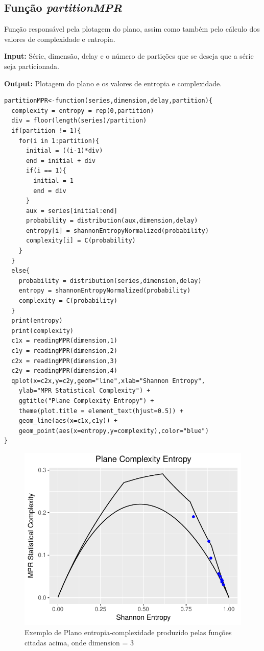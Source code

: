 \documentclass[12pt,letterpaper]{article}
\begin{document}
\subsection{Função \textit{partitionMPR}}

Função responsável pela plotagem do plano, assim como também pelo cálculo dos valores de complexidade e entropia.

\textbf{Input: } Série, dimensão, delay e o número de partições que se deseja que a série seja particionada.

\textbf{Output: } Plotagem do plano e os valores de entropia e complexidade.

\begin{lstlisting}
partitionMPR<-function(series,dimension,delay,partition){
  complexity = entropy = rep(0,partition)
  div = floor(length(series)/partition)
  if(partition != 1){
    for(i in 1:partition){
      initial = ((i-1)*div)
      end = initial + div
      if(i == 1){
        initial = 1
        end = div
      }
      aux = series[initial:end]
      probability = distribution(aux,dimension,delay)
      entropy[i] = shannonEntropyNormalized(probability)
      complexity[i] = C(probability)
    }
  }
  else{
    probability = distribution(series,dimension,delay)
    entropy = shannonEntropyNormalized(probability)
    complexity = C(probability)
  }
  print(entropy)
  print(complexity)
  c1x = readingMPR(dimension,1)
  c1y = readingMPR(dimension,2)
  c2x = readingMPR(dimension,3)
  c2y = readingMPR(dimension,4)
  qplot(x=c2x,y=c2y,geom="line",xlab="Shannon Entropy",
  	ylab="MPR Statistical Complexity") +
    ggtitle("Plane Complexity Entropy") +
    theme(plot.title = element_text(hjust=0.5)) +
    geom_line(aes(x=c1x,c1y)) + 
    geom_point(aes(x=entropy,y=complexity),color="blue")
}
\end{lstlisting}

\begin{figure}[!hbt]
	\begin{center}
		\includegraphics[width=\columnwidth]{complexity-entropy.pdf}
		\caption{Exemplo de Plano entropia-complexidade produzido pelas funções citadas acima, onde dimension = 3}
		\label{fig:complexity-entropy.pdf}
	\end{center}
\end{figure}
\end{document}
